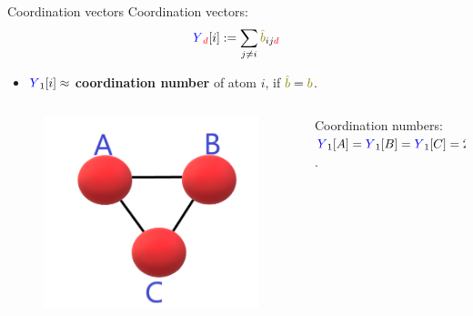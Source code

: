 \documentclass{beamer}
\begin{document}
\begin{frame}{Coordination vectors}
    Coordination vectors:
    \begin{equation}
        {\color{blue}Y}_{\color{red}d}[i] := \sum_{j\neq i}{\color{olive}\hat{b}}_{ij{\color{red}d}}
    \end{equation}
    \begin{itemize}
        \item ${\color{blue}Y}_1[i] \approx $ \textbf{coordination number} of atom $i$, if ${\color{olive}\hat{b}} = {\color{olive}b}$.
    \end{itemize}
    \begin{columns}
        \begin{column}{0.5\textwidth}
            \begin{figure}[H]
                \centering
                    \includegraphics[scale=0.33]{img/slide/triatom_covalent.png}
                \label{fig:triatom_covalent}
            \end{figure}
        \end{column}
        \begin{column}{0.5\textwidth}
            Coordination numbers: ${\color{blue}Y}_1[A] = {\color{blue}Y}_1[B] = {\color{blue}Y}_1[C] = 2$.
        \end{column}
    \end{columns}
\end{frame}
\end{document}
